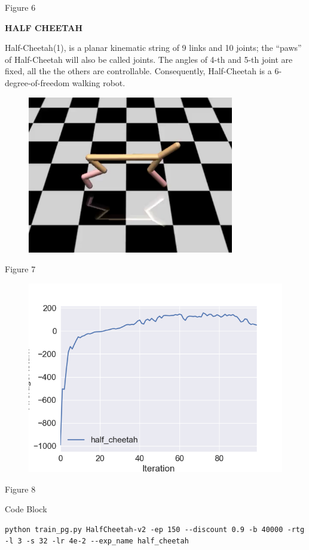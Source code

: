 \documentclass[10pt]{article}
\makeatletter
\def\maxwidth{\ifdim\Gin@nat@width>\linewidth\linewidth
\else\Gin@nat@width\fi}
\let\Oldincludegraphics\includegraphics
\renewcommand{\includegraphics}[1]{\Oldincludegraphics[width=\maxwidth]{#1}}
\makeatother
\begin{document}
Figure 6

\textbf{HALF CHEETAH}

Half-Cheetah(1), is a planar kinematic string of 9 links and 10 joints;
the “paws” of Half-Cheetah will also be called joints. The angles of
4-th and 5-th joint are fixed, all the the others are controllable.
Consequently, Half-Cheetah is a 6-degree-of-freedom walking robot.

\begin{figure}
\centering
\includegraphics{Images/half-ch.PNG}
\caption{}
\end{figure}

Figure 7

\begin{figure}
\centering
\includegraphics{Images/half-cheetah.png}
\caption{}
\end{figure}

Figure 8

Code Block

\begin{verbatim}
python train_pg.py HalfCheetah-v2 -ep 150 --discount 0.9 -b 40000 -rtg -l 3 -s 32 -lr 4e-2 --exp_name half_cheetah
\end{verbatim}
\end{document}
